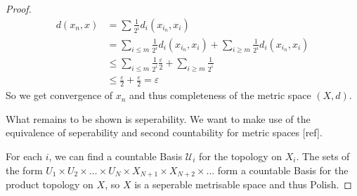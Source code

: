 \documentclass[10pt, a4paper, titlepage]{article}
\numberwithin{equation}{section}
\begin{document}
\begin{proof}
\begin{align*}
	d\left( x_{n},x \right) &= \sum \frac{1}{2^i} d_i\left( x_{i_n},x_i \right)\\
				&= \sum_{i\leq m} \frac{1}{2^i} d_i\left( x_{i_n},x_i \right) + \sum_{i \geq m} \frac{1}{2^i} d_i\left( x_{i_n},x_i \right) \\
				&\leq \sum_{i \leq m} \frac{1}{2^i} \frac{\varepsilon}{2} + \sum_{i\geq m} \frac{1}{2^i} \\
				&\leq \frac{\varepsilon}{2} + \frac{\varepsilon}{2} = \varepsilon
\end{align*}
So we get convergence of $x_n$ and thus completeness of the metric space $\left( X,d \right) $. 

What remains to be shown is seperability. We want to make use of the equivalence of seperability and second countability for metric spaces [ref].

For each $i$, we can find a countable Basis  $\mathcal{U}_i$ for the topology on $X_i$.
The sets of the form $U_1 \times U_2 \times \ldots \times U_N \times X_{N+1} \times X_{N+2} \times \ldots$ form a countable Basis for the product topology on $X$, 
so  $X$ is a seperable metrisable space and thus Polish.
\end{proof}
\end{document}
